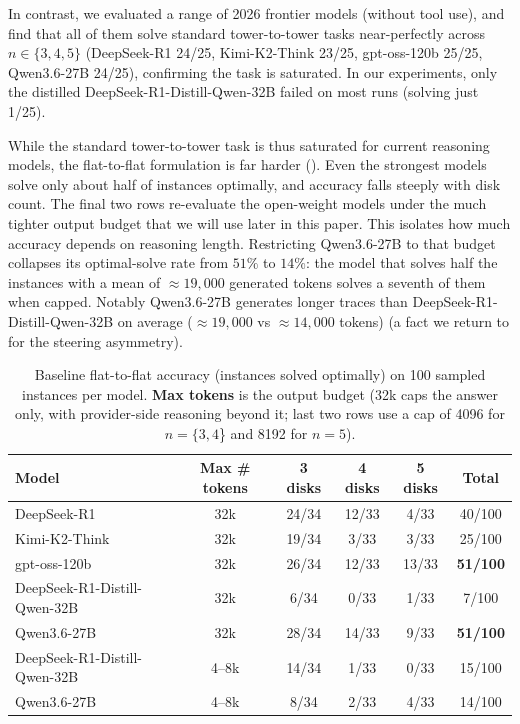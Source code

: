 \documentclass{article} %
\begin{document}
In contrast, we evaluated a range of 2026 frontier models (without tool use), and find that all of them solve standard tower-to-tower tasks near-perfectly across $n\in\{3,4,5\}$ (DeepSeek-R1 24/25, Kimi-K2-Think 23/25, gpt-oss-120b 25/25, Qwen3.6-27B 24/25), confirming the task is saturated. In our experiments, only the distilled DeepSeek-R1-Distill-Qwen-32B failed on most runs (solving just 1/25).

While the standard tower-to-tower task is thus saturated for current reasoning models, the flat-to-flat formulation is far harder (). Even the strongest models solve only about half of instances optimally, and accuracy falls steeply with disk count. The final two rows re-evaluate the open-weight models under the much tighter output budget that we will use later in this paper. This isolates how much accuracy depends on reasoning length. Restricting Qwen3.6-27B to that budget collapses its optimal-solve rate from $51\%$ to $14\%$:%
the model that solves half the instances with a mean of $\approx19{,}000$ generated tokens solves a seventh of them when capped. Notably Qwen3.6-27B generates longer traces than DeepSeek-R1-Distill-Qwen-32B on average ($\approx19{,}000$ vs $\approx14{,}000$ tokens) (a fact we return to for the steering asymmetry).

\begin{table}[t]
  \centering
  \caption{Baseline flat-to-flat accuracy (instances solved optimally) on 100 sampled instances per model. \textbf{Max tokens} is the output budget (32k caps the answer only, with provider-side reasoning beyond it; last two rows use a cap of 4096 for $n= \{3, 4$\} and 8192 for $n = 5$).}
  \label{tab:flatflat}
  \begin{tabular}{lccccc}
    \toprule
    \textbf{Model} & \textbf{Max \# tokens} & \textbf{3 disks} & \textbf{4 disks} & \textbf{5 disks} & \textbf{Total} \\
    \midrule
    DeepSeek-R1                  & 32k & 24/34 & 12/33 & 4/33  & 40/100 \\
    Kimi-K2-Think                & 32k & 19/34 & 3/33  & 3/33  & 25/100 \\
    gpt-oss-120b                 & 32k & 26/34 & 12/33 & 13/33 & \textbf{51/100} \\
    \midrule
    DeepSeek-R1-Distill-Qwen-32B & 32k & 6/34  & 0/33  & 1/33  & 7/100 \\
    Qwen3.6-27B                  & 32k & 28/34 & 14/33 & 9/33  & \textbf{51/100} \\
    \midrule
    DeepSeek-R1-Distill-Qwen-32B & 4--8k & 14/34 & 1/33 & 0/33 & 15/100 \\
    Qwen3.6-27B                  & 4--8k & 8/34  & 2/33 & 4/33 & 14/100 \\
    \bottomrule
  \end{tabular}
\end{table}
\end{document}
